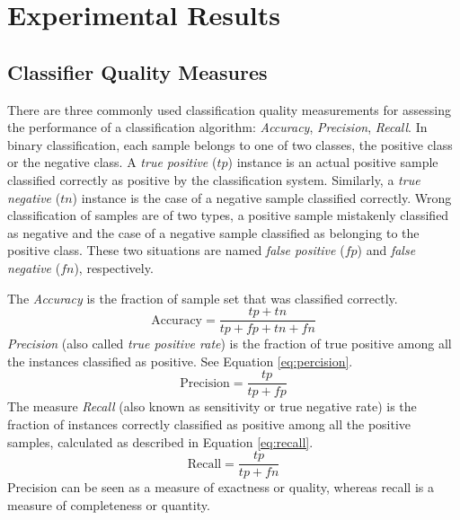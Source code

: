 \section{Experimental Results}
\label{sec:classification_results}

\subsection{Classifier Quality Measures}
\iftoggle{edit-mode}{\hspace{0pt}\marginpar{Classification types}}{}
There are three commonly used classification quality measurements for assessing the performance of a classification algorithm: \emph{Accuracy}, \emph{Precision}, \emph{Recall}.
In binary classification, each sample belongs to one of two classes, the positive class or the negative class.
A \emph{true positive} ($tp$) instance is an actual positive sample classified correctly as positive by the classification system.
Similarly, a \emph{true negative} ($tn$) instance is the case of a negative sample classified correctly.  
Wrong classification of samples are of two types, a positive sample mistakenly classified as negative and the case of a negative sample classified as belonging to the positive class. 
These two situations are named \emph{false positive} ($fp$) and \emph{false negative} ($fn$), respectively.

\iftoggle{edit-mode}{\hspace{0pt}\marginpar{Classification quality measurements - binary}}{}
The \emph{Accuracy} is the fraction of sample set that was classified correctly. 
\begin{equation}
\text{Accuracy}=\frac{tp+tn}{tp+fp+tn+fn}
\label{eq:accuracy}
\end{equation}
\emph{Precision} (also called \emph{true positive rate}) is the fraction of true positive among all the instances classified as positive. 
See Equation \ref{eq:percision}.
\begin{equation}
\text{Precision}=\frac{tp}{tp+fp}
\label{eq:percision}
\end{equation}
The measure \emph{Recall} (also known as sensitivity or true negative rate) is the fraction of instances correctly classified as positive among all the positive samples, calculated as described in Equation \ref{eq:recall}.
\begin{equation}
\text{Recall}=\frac{tp}{tp+fn}  
\label{eq:recall}
\end{equation}
Precision can be seen as a measure of exactness or quality, whereas recall is a measure of completeness or quantity.

